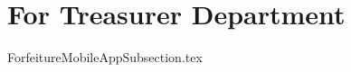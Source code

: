 \documentclass[class=book , crop=false]{standalone}
\begin{document}
\section{For Treasurer Department}
{ForfeitureMobileAppSubsection.tex}
\end{document}
